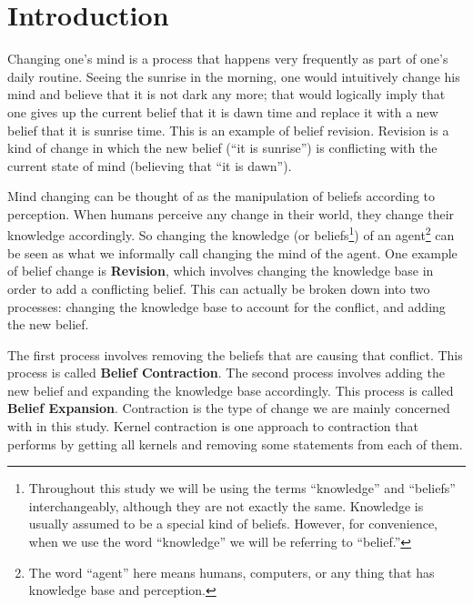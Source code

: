 \chapter{Introduction}

Changing one's mind is a process that happens very frequently as part of one's daily routine. Seeing the sunrise in the morning, one would intuitively change his mind and believe that it is not dark any more; that would logically imply that one gives up the current belief that it is dawn time and replace it with a new belief that it is sunrise time. This is an example of belief revision. Revision is a kind of change in which the new belief (``it is sunrise'') is conflicting with the current state of mind (believing that ``it is dawn''). 

Mind changing can be thought of as the manipulation of beliefs according to perception. When humans perceive any change in their world, they change their knowledge accordingly. So changing the knowledge (or beliefs\footnote{Throughout this study we will be using the terms ``knowledge'' and ``beliefs'' interchangeably, although they are not exactly the same. Knowledge is usually assumed to be a special kind of beliefs. However, for convenience, when we use the word ``knowledge'' we will be referring to ``belief.'' }) of an agent\footnote{The word ``agent'' here means humans, computers, or any thing that has knowledge base and perception.} can be seen as what we informally call changing the mind of the agent. One example of belief change is \textbf{Revision}, which involves changing the knowledge base in order to add a conflicting belief. This can actually be broken down into two processes: changing the knowledge base to account for the conflict, and adding the new belief. 

The first process involves removing the beliefs that are causing that conflict. This process is called \textbf{Belief Contraction}. The second process involves adding the new belief and expanding the knowledge base accordingly. This process is called \textbf{Belief Expansion}. Contraction is the type of change we are mainly concerned with in this study. Kernel contraction is one approach to contraction that performs by getting all kernels and removing some statements from each of them. 

